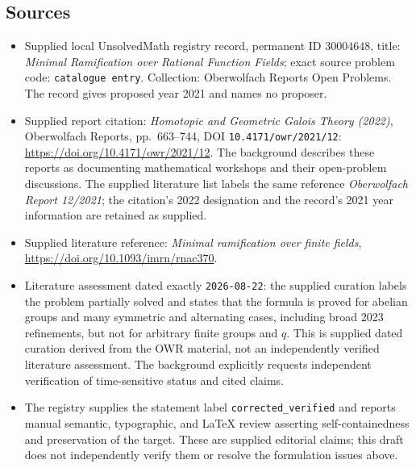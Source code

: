 \documentclass[11pt]{article}
\begin{document}
\subsection{Sources}
\begin{itemize}
\item Supplied local UnsolvedMath registry record, permanent ID \(30004648\), title: \emph{Minimal Ramification over Rational Function Fields}; exact source problem code: \texttt{catalogue entry}. Collection: Oberwolfach Reports Open Problems. The record gives proposed year 2021 and names no proposer.
\item Supplied report citation: \emph{Homotopic and Geometric Galois Theory (2022)}, Oberwolfach Reports, pp.~663--744, DOI \texttt{10.4171/owr/2021/12}: \url{https://doi.org/10.4171/owr/2021/12}. The background describes these reports as documenting mathematical workshops and their open-problem discussions. The supplied literature list labels the same reference \emph{Oberwolfach Report 12/2021}; the citation's 2022 designation and the record's 2021 year information are retained as supplied.
\item Supplied literature reference: \emph{Minimal ramification over finite fields}, \url{https://doi.org/10.1093/imrn/rnac370}.
\item Literature assessment dated exactly \texttt{2026-08-22}: the supplied curation labels the problem partially solved and states that the formula is proved for abelian groups and many symmetric and alternating cases, including broad 2023 refinements, but not for arbitrary finite groups and \(q\). This is supplied dated curation derived from the OWR material, not an independently verified literature assessment. The background explicitly requests independent verification of time-sensitive status and cited claims.
\item The registry supplies the statement label \texttt{corrected\_verified} and reports manual semantic, typographic, and LaTeX review asserting self-containedness and preservation of the target. These are supplied editorial claims; this draft does not independently verify them or resolve the formulation issues above.
\end{itemize}
\end{document}
